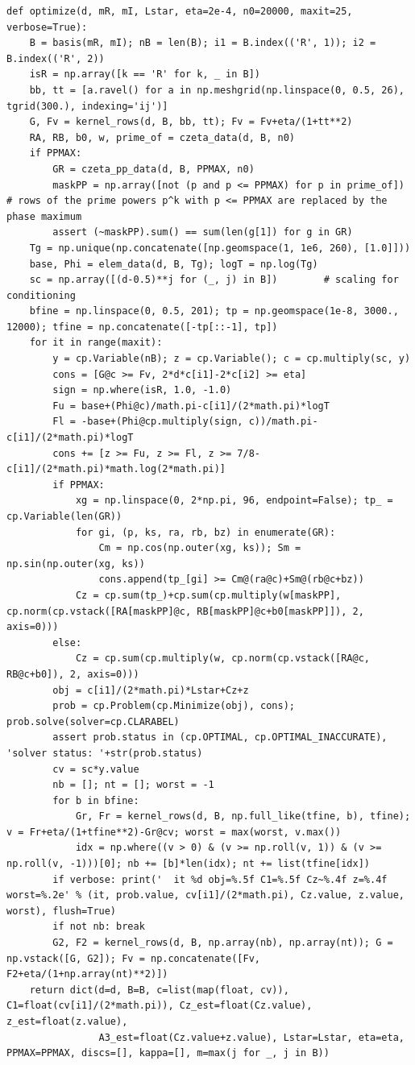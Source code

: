 \documentclass[11pt,reqno]{amsart}
\numberwithin{equation}{section}
\theoremstyle{definition}
\theoremstyle{remark}
\begin{document}
\begin{lstlisting}
def optimize(d, mR, mI, Lstar, eta=2e-4, n0=20000, maxit=25, verbose=True):
    B = basis(mR, mI); nB = len(B); i1 = B.index(('R', 1)); i2 = B.index(('R', 2))
    isR = np.array([k == 'R' for k, _ in B])
    bb, tt = [a.ravel() for a in np.meshgrid(np.linspace(0, 0.5, 26), tgrid(300.), indexing='ij')]
    G, Fv = kernel_rows(d, B, bb, tt); Fv = Fv+eta/(1+tt**2)
    RA, RB, b0, w, prime_of = czeta_data(d, B, n0)
    if PPMAX:
        GR = czeta_pp_data(d, B, PPMAX, n0)
        maskPP = np.array([not (p and p <= PPMAX) for p in prime_of])     # rows of the prime powers p^k with p <= PPMAX are replaced by the phase maximum
        assert (~maskPP).sum() == sum(len(g[1]) for g in GR)
    Tg = np.unique(np.concatenate([np.geomspace(1, 1e6, 260), [1.0]]))
    base, Phi = elem_data(d, B, Tg); logT = np.log(Tg)
    sc = np.array([(d-0.5)**j for (_, j) in B])        # scaling for conditioning
    bfine = np.linspace(0, 0.5, 201); tp = np.geomspace(1e-8, 3000., 12000); tfine = np.concatenate([-tp[::-1], tp])
    for it in range(maxit):
        y = cp.Variable(nB); z = cp.Variable(); c = cp.multiply(sc, y)
        cons = [G@c >= Fv, 2*d*c[i1]-2*c[i2] >= eta]
        sign = np.where(isR, 1.0, -1.0)
        Fu = base+(Phi@c)/math.pi-c[i1]/(2*math.pi)*logT
        Fl = -base+(Phi@cp.multiply(sign, c))/math.pi-c[i1]/(2*math.pi)*logT
        cons += [z >= Fu, z >= Fl, z >= 7/8-c[i1]/(2*math.pi)*math.log(2*math.pi)]
        if PPMAX:
            xg = np.linspace(0, 2*np.pi, 96, endpoint=False); tp_ = cp.Variable(len(GR))
            for gi, (p, ks, ra, rb, bz) in enumerate(GR):
                Cm = np.cos(np.outer(xg, ks)); Sm = np.sin(np.outer(xg, ks))
                cons.append(tp_[gi] >= Cm@(ra@c)+Sm@(rb@c+bz))
            Cz = cp.sum(tp_)+cp.sum(cp.multiply(w[maskPP], cp.norm(cp.vstack([RA[maskPP]@c, RB[maskPP]@c+b0[maskPP]]), 2, axis=0)))
        else:
            Cz = cp.sum(cp.multiply(w, cp.norm(cp.vstack([RA@c, RB@c+b0]), 2, axis=0)))
        obj = c[i1]/(2*math.pi)*Lstar+Cz+z
        prob = cp.Problem(cp.Minimize(obj), cons); prob.solve(solver=cp.CLARABEL)
        assert prob.status in (cp.OPTIMAL, cp.OPTIMAL_INACCURATE), 'solver status: '+str(prob.status)
        cv = sc*y.value
        nb = []; nt = []; worst = -1
        for b in bfine:
            Gr, Fr = kernel_rows(d, B, np.full_like(tfine, b), tfine); v = Fr+eta/(1+tfine**2)-Gr@cv; worst = max(worst, v.max())
            idx = np.where((v > 0) & (v >= np.roll(v, 1)) & (v >= np.roll(v, -1)))[0]; nb += [b]*len(idx); nt += list(tfine[idx])
        if verbose: print('  it %d obj=%.5f C1=%.5f Cz~%.4f z=%.4f worst=%.2e' % (it, prob.value, cv[i1]/(2*math.pi), Cz.value, z.value, worst), flush=True)
        if not nb: break
        G2, F2 = kernel_rows(d, B, np.array(nb), np.array(nt)); G = np.vstack([G, G2]); Fv = np.concatenate([Fv, F2+eta/(1+np.array(nt)**2)])
    return dict(d=d, B=B, c=list(map(float, cv)), C1=float(cv[i1]/(2*math.pi)), Cz_est=float(Cz.value), z_est=float(z.value),
                A3_est=float(Cz.value+z.value), Lstar=Lstar, eta=eta, PPMAX=PPMAX, discs=[], kappa=[], m=max(j for _, j in B))


\end{lstlisting}
\end{document}
